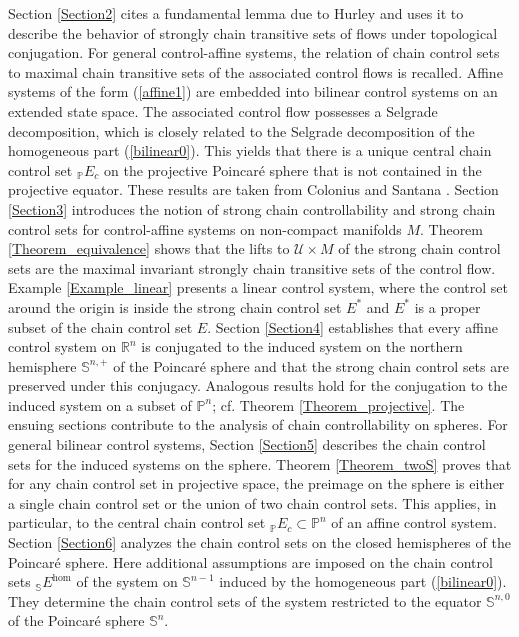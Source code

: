 \documentclass[preprint,12pt]{elsarticle}
\begin{document}
Section \ref{Section2} cites a fundamental lemma due to Hurley \cite{Hur95}
and uses it to describe the behavior of strongly chain transitive sets of
flows under topological conjugation. For general control-affine systems, the
relation of chain control sets to maximal chain transitive sets of the
associated control flows is recalled. Affine systems of the form
(\ref{affine1}) are embedded into bilinear control systems on an extended
state space. The associated control flow possesses a Selgrade decomposition,
which is closely related to the Selgrade decomposition of the homogeneous part
(\ref{bilinear0}). This yields that there is a unique central chain control
set $_{\mathbb{P}}E_{c}$ on the projective Poincar\'{e} sphere that is not
contained in the projective equator. These results are taken from Colonius and
Santana \cite{ColS24a}. Section \ref{Section3} introduces the notion of strong
chain controllability and strong chain control sets for control-affine systems
on non-compact manifolds $M$. Theorem \ref{Theorem_equivalence} shows that the
lifts to $\mathcal{U}\times M$ of the strong chain control sets are the
maximal invariant strongly chain transitive sets of the control flow. Example
\ref{Example_linear} presents a linear control system, where the control set
around the origin is inside the strong chain control set $E^{\ast}$ and
$E^{\ast}$ is a proper subset of the chain control set $E$. Section
\ref{Section4} establishes that every affine control system on $\mathbb{R}%
^{n}$ is conjugated to the induced system on the northern hemisphere
$\mathbb{S}^{n,+}$ of the Poincar\'{e} sphere and that the strong chain
control sets are preserved under this conjugacy. Analogous results hold for
the conjugation to the induced system on a subset of $\mathbb{P}^{n}$; cf.
Theorem \ref{Theorem_projective}. The ensuing sections contribute to the
analysis of chain controllability on spheres. For general bilinear control
systems, Section \ref{Section5} describes the chain control sets for the
induced systems on the sphere. Theorem \ref{Theorem_twoS} proves that for any
chain control set in projective space, the preimage on the sphere is either a
single chain control set or the union of two chain control sets. This applies,
in particular, to the central chain control set $_{\mathbb{P}}E_{c}%
\subset\mathbb{P}^{n}$ of an affine control system. Section \ref{Section6}
analyzes the chain control sets on the closed hemispheres of the Poincar\'{e}
sphere. Here additional assumptions are imposed on the chain control sets
$_{\mathbb{S}}E^{\hom}$ of the system on $\mathbb{S}^{n-1}$ induced by the
homogeneous part (\ref{bilinear0}). They determine the chain control sets of
the system restricted to the equator $\mathbb{S}^{n,0}$ of the Poincar\'{e}
sphere $\mathbb{S}^{n}$.
\end{document}
